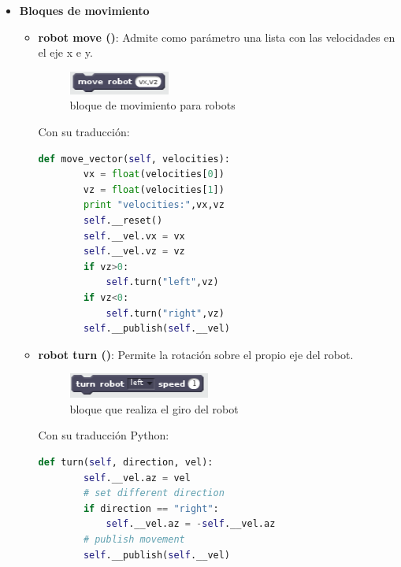 \begin{itemize}
\begin{itemize}
	\end{itemize}
\item \textbf{Bloques de movimiento}
	\begin{itemize}

	\item \textbf{robot move ()}: Admite como parámetro una lista con las velocidades en el eje x e y.
		\begin{figure}[H]
     		\centering
     		\includegraphics[scale=1.2]{img/block-move-robot.png}
     		\caption{bloque de movimiento para robots}
  		\label{fig:listas}
  	\end{figure}
  	
Con su traducción:\\

\begin{lstlisting}[language=python,firstnumber=1]
    def move_vector(self, velocities):
        vx = float(velocities[0])
        vz = float(velocities[1])
        print "velocities:",vx,vz
        self.__reset()
        self.__vel.vx = vx
        self.__vel.vz = vz
        if vz>0:
            self.turn("left",vz)
        if vz<0:
            self.turn("right",vz)
        self.__publish(self.__vel)
\end{lstlisting}

	\item \textbf{robot turn ()}: Permite la rotación sobre el propio eje del robot.
	\begin{figure}[H]
     		\centering
     		\includegraphics[scale=1.2]{img/block-turn.png}
     		\caption{bloque que realiza el giro del robot}
  		\label{fig:listas}
  	\end{figure}
  	
Con su traducción Python:\\

\begin{lstlisting}[language=python,firstnumber=1]
    def turn(self, direction, vel):
        self.__vel.az = vel
        # set different direction
        if direction == "right":
            self.__vel.az = -self.__vel.az
        # publish movement
        self.__publish(self.__vel)
\end{lstlisting}
	\end{itemize}
\end{itemize}

